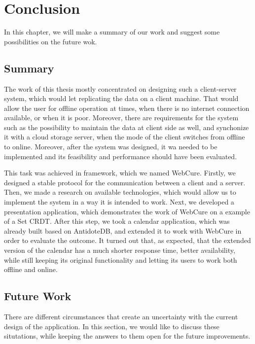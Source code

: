 \chapter{Conclusion}
\label{Conclusion}

In this chapter, we will make a summary of our work and suggest some possibilities on the future wok.

\section{Summary}
\label{summary}

The work of this thesis mostly concentrated on designing such a client-server system, which would let replicating the data on a client machine. That would allow the user for offline operation at times, when there is no internet connection available, or when it is poor. Moreover, there are requirements for the system such as the possibility to maintain the data at client side as well, and synchonize it with a cloud storage server, when the mode of the client switches from offline to online. Moreover, after the system was designed, it wa needed to be implemented and its feasibility and performance should have been evaluated.

This task was achieved in framework, which we named WebCure. Firstly, we designed a stable protocol for the communication between a client and a server. Then, we made a research on available technologies, which would allow us to implement the system in a way it is intended to work. Next, we developed a presentation application, which demonstrates the work of WebCure on a example of a Set CRDT. After this step, we took a calendar application, which was already built based on AntidoteDB, and extended it to work with WebCure in order to evaluate the outcome. It turned out that, as expected, that the extended version of the calendar has a much shorter response time, better availability, while still keeping its original functionality and letting its users to work both offline and online. 

\section{Future Work}
\label{futurework}

There are different circumstances that create an uncertainty with the current design of the application. In this section, we would like to discuss these situtations, while keeping the answers to them open for the future improvements.

